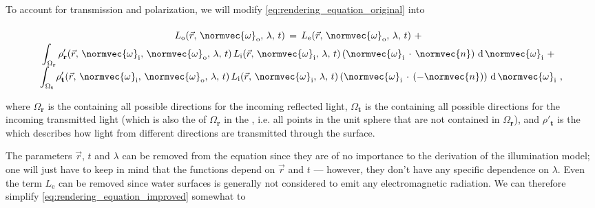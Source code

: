 {To account for transmission and polarization, we will modify \eqref{eq:rendering_equation_original} into

\begin{equation} \label{eq:rendering_equation_improved}
\renewcommand*{\arraystretch}{1.5}
\begin{array}{cl}
L_{\text{o}}(\vec{r},\,\normvec{\omega}_{\text{o}},\, \lambda,\, t) \,=\, L_{\text{e}}(\vec{r},\, \normvec{\omega}_{\text{o}},\, \lambda,\, t) \ + \\
\displaystyle \int_{\Omega_{\textbf{r}}} \rho'_{\textbf{r}}(\vec{r},\, \normvec{\omega}_{\text{i}},\, \normvec{\omega}_{\text{o}},\, \lambda,\, t)\, L_{\text{i}}(\vec{r},\, \normvec{\omega}_{\text{i}},\, \lambda,\, t)\, (\normvec{\omega}_{\text{i}}\,\cdot\,\normvec{n})\, \operatorname d \normvec{\omega}_{\text{i}} \ + \\
\displaystyle \int_{\Omega_{\textbf{t}}} \rho'_{\textbf{t}}(\vec{r},\, \normvec{\omega}_{\text{i}},\, \normvec{\omega}_{\text{o}},\, \lambda,\, t)\, L_{\text{i}}(\vec{r},\, \normvec{\omega}_{\text{i}},\, \lambda,\, t)\, (\normvec{\omega}_{\text{i}}\,\cdot\,(-\normvec{n}))\, \operatorname d \normvec{\omega}_{\text{i}} & \!\!\!\! ,
\end{array}
\end{equation}

where $\Omega_{\textbf{r}}$ is the  containing all possible directions for the incoming reflected light, $\Omega_{\textbf{t}}$ is the  containing all possible directions for the incoming transmitted light (which is also the  of $\Omega_{\textbf{r}}$ in the , i.e. all points in the unit sphere that are not contained in $\Omega_{\textbf{r}}$), and $\rho'_{\textbf{t}}$ is the \BTDF which describes how light from different directions are transmitted through the surface.

The parameters $\vec{r}$, $t$ and $\lambda$ can be removed from the equation since they are of no importance to the derivation of the illumination model; one will just have to keep in mind that the functions depend on $\vec{r}$ and $t$ --- however, they don't have any specific dependence on $\lambda$. Even the term $L_{\text{e}}$ can be removed since water surfaces is generally not considered to emit any electromagnetic radiation. We can therefore simplify \eqref{eq:rendering_equation_improved} somewhat to

}
